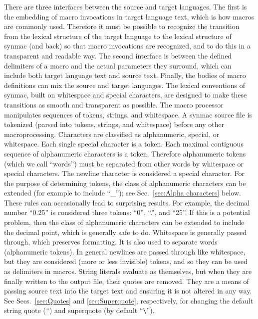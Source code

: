 \documentclass[12pt]{article}
\begin{document}
There are three interfaces between the source and target languages.
The first is the embedding of macro invocations in target language text, which is how macros are commonly used.
Therefore it must be possible to recognize the transition from the lexical structure of the target language to the lexical structure of synmac (and back) so that macro invocations are recognized, and to do this in a transparent and readable way.
The second interface is between the defined delimiters of a macro and the actual parameters they surround, which can include both target language text and source text.
Finally, the bodies of macro definitions can mix the source and target languages.
The lexical conventions of synmac, built on whitespace and special characters, are designed to make these transitions as smooth and transparent as possible.
The macro processor manipulates sequences of tokens, strings, and whitespace.
A synmac source file is tokenized (parsed into tokens, strings, and whitespace) before any other macroprocessing.
Characters are classified as alphanumeric, special, or whitespace. Each single special character is a token. Each maximal contiguous sequence of alphanumeric characters is a token. Therefore alphanumeric tokens (which we call ``words'') must be separated from other words by whitespace or special characters. The newline character is considered a special character. For the purpose of determining tokens, the class of alphanumeric characters can be extended (for example to include ``\_'');
see Sec.\ \ref{sec:Alpha characters} below.
These rules can occasionally lead to surprising results.
For example, the decimal number ``0.25'' is considered three tokens: ``0'', ``.'', and ``25''.
If this is a potential problem, then the class of alphanumeric characters can be extended to include the decimal point, which is generally safe to do.
Whitespace is generally passed through, which preserves formatting. It is also used to separate words (alphanumeric tokens).
In general newlines are passed through like whitespace, but they are considered (more or less invisible) tokens, and so they can be used as delimiters in macros.
String literals evaluate as themselves, but when they are finally written to the output file, their quotes are removed. 
They are a means of passing source text into the target text and ensuring it is not altered in any way. 
See Secs.\ \ref{sec:Quotes} and \ref{sec:Superquote}, respectively, for changing the default string quote (\verb+"+) and superquote (by default ``\verb+\+'').
\end{document}
